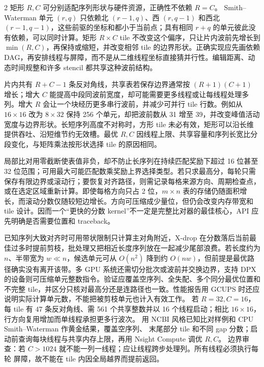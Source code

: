 \begin{solutionexercise}{2}
\conclusionheading 矩形 $R,C$ 可分别适配序列形状与硬件资源，正确性不依赖 $R=C$。
\discussionheading
{}Smith--Waterman 单元 $(r,q)$ 只依赖北 $(r-1,q)$、西 $(r,q-1)$ 和西北 $(r-1,q-1)$，这些前驱的坐标和都小于当前点；具有相同 $r+q$ 的单元彼此没有依赖，可以同时计算。矩形 $R\times C$ tile 不改变这个偏序，只让片内波前先增长到 $\min(R,C)$，再保持或缩短，并改变相邻 tile 的边界形状。正确实现应先画依赖 DAG，再安排线程与屏障，而不是从二维线程坐标直接猜并行性。编辑距离、动态时间规整和许多 stencil 都共享这种波前结构。

片内共有 $R+C-1$ 条反对角线，共享表若保存边界通常按 $(R+1)(C+1)$ 增长；增大 $C$ 能提高中段同波前宽度，却可能需要更多线程或让每线程处理多列。增大 $R$ 会让一个块经历更多串行波前，并减少可并行 tile 行数。例如从 $16\times16$ 改为 $8\times32$ 保持 256 个单元，却把波前数从 31 增至 39，并改变峰值活动宽度与边界形状。长短序列高度不对称时，方形 tile 未必有效，矩形可以沿长维提供吞吐、沿短维节约无效槽。最优 $R,C$ 因线程上限、共享容量和序列长宽比分段变化，与矩阵乘法按形状选择 tile 的原因相同。

局部比对用零截断使表值非负，却不防止长序列在持续匹配奖励下超过 16 位甚至 32 位范围；可用最大可能匹配数乘奖励上界选择类型。若只求最高分，每轮只需保存有限边界或滚动行；要恢复对齐路径，则需记录每格来源方向、周期检查点，或在选定区域重新计算。即使每格方向只占 2 位，$m\times n$ 表的存储仍随面积增长，而滚动分数仅随较短边增长。方向可压缩成少量位，但仍会改变内存带宽和 tile 设计。因而一个“更快的分数 kernel”不一定是完整比对器的最佳核心，API 应先明确是否需要位置和 traceback。

已知序列大致对齐时可用带状限制只计算主对角附近，X-drop 在分数落后当前最佳过多时提前剪枝，批处理又把相近长度序列放在一起减少尾部浪费。若长度约为 $n$、半带宽为 $w\ll n$，候选单元可从 $O(n^2)$ 降到约 $O(nw)$，但前提是最优路径确实没有离开该带。多 GPU 系统还需切分批次或波前并交换边界，支持 DPX 的设备则可压缩单元整数指令。验证应覆盖空序列、全失配、多个同分最优位置和不完整 tile，并区分只核对最高分还是连路径也一致。性能报告用 GCUPS 时还应说明实际计算单元数，不能把被剪枝单元也计入有效工作。
\variantheading 若 $R=32,C=16$，每 tile 有 $47$ 条反对角线、需 561 个共享整数并以
16 个线程启动；相比 $16\times16$，行方向复用增加而单线程承担更多行波次。
\practiceheading 用 NCBI 风格已知比对样例和 CPU Smith--Waterman 作黄金结果，覆盖空序列、
末尾部分 tile 和不同 gap 分数；启动前查询每块线程与共享内存上限，再用 Nsight Compute
调优 $R,C$。
边界审查：若 $C>1024$ 就不能一列一线程；应让线程跨步处理列。所有线程必须执行每轮
屏障，故不能在 tile 内因全局越界而提前返回。
\end{solutionexercise}

